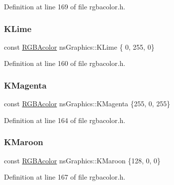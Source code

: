 Definition at line 169 of file rgbacolor.\+h.

\mbox{\label{namespacens_graphics_abfa46e909a7f8d4d908e70e4b55f734c}} 
\subsubsection{\texorpdfstring{K\+Lime}{KLime}}
{\footnotesize\ttfamily const \hyperlink{classns_graphics_1_1_r_g_b_acolor}{R\+G\+B\+Acolor} ns\+Graphics\+::\+K\+Lime \{ 0, 255, 0\}}



Definition at line 160 of file rgbacolor.\+h.

\mbox{\label{namespacens_graphics_ad0a8ee009f367326525d2cbd47cd5dea}} 
\subsubsection{\texorpdfstring{K\+Magenta}{KMagenta}}
{\footnotesize\ttfamily const \hyperlink{classns_graphics_1_1_r_g_b_acolor}{R\+G\+B\+Acolor} ns\+Graphics\+::\+K\+Magenta \{255, 0, 255\}}



Definition at line 164 of file rgbacolor.\+h.

\mbox{\label{namespacens_graphics_a219354b4276a9edbfc436390ba3a4827}} 
\subsubsection{\texorpdfstring{K\+Maroon}{KMaroon}}
{\footnotesize\ttfamily const \hyperlink{classns_graphics_1_1_r_g_b_acolor}{R\+G\+B\+Acolor} ns\+Graphics\+::\+K\+Maroon \{128, 0, 0\}}



Definition at line 167 of file rgbacolor.\+h.

\mbox{\label{namespacens_graphics_a4ea1ef3950c89b063d76e0a13faf5ce8}} 
